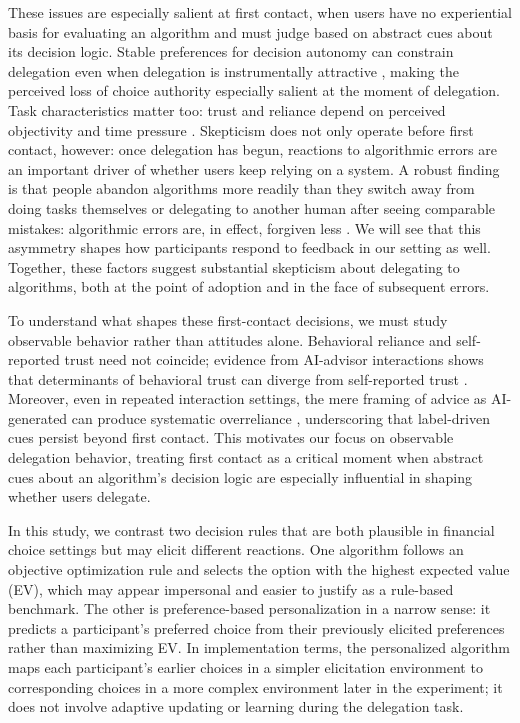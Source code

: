 \documentclass[a4paper, 12pt, fleqn]{article}
\theoremstyle{definition}
\begin{document}
These issues are especially salient at first contact, when users have no experiential basis for evaluating an algorithm and must judge based on abstract cues about its decision logic. Stable preferences for decision autonomy can constrain delegation even when delegation is instrumentally attractive \citep{Ivanova-Stenzel2025}, making the perceived loss of choice authority especially salient at the moment of delegation. Task characteristics matter too: trust and reliance depend on perceived objectivity and time pressure \citep{Yang2025}. Skepticism does not only operate before first contact, however: once delegation has begun, reactions to algorithmic errors are an important driver of whether users keep relying on a system. A robust finding is that people abandon algorithms more readily than they switch away from doing tasks themselves or delegating to another human after seeing comparable mistakes: algorithmic errors are, in effect, forgiven less \citep{Dietvorst2015,Renier2021}. We will see that this asymmetry shapes how participants respond to feedback in our setting as well. Together, these factors suggest substantial skepticism about delegating to algorithms, both at the point of adoption and in the face of subsequent errors.

To understand what shapes these first-contact decisions, we must study observable behavior rather than attitudes alone. Behavioral reliance and self-reported trust need not coincide; evidence from AI-advisor interactions shows that determinants of behavioral trust can diverge from self-reported trust \citep{Schreibelmayr2025}. Moreover, even in repeated interaction settings, the mere framing of advice as AI-generated can produce systematic overreliance \citep{Klingbeil2024}, underscoring that label-driven cues persist beyond first contact. This motivates our focus on observable delegation behavior, treating first contact as a critical moment when abstract cues about an algorithm's decision logic are especially influential in shaping whether users delegate.

In this study, we contrast two decision rules that are both plausible in financial choice settings but may elicit different reactions. One algorithm follows an objective optimization rule and selects the option with the highest expected value (EV), which may appear impersonal and easier to justify as a rule-based benchmark. The other is preference-based personalization in a narrow sense: it predicts a participant's preferred choice from their previously elicited preferences rather than maximizing EV. In implementation terms, the personalized algorithm maps each participant's earlier choices in a simpler elicitation environment to corresponding choices in a more complex environment later in the experiment; it does not involve adaptive updating or learning during the delegation task.
\end{document}
